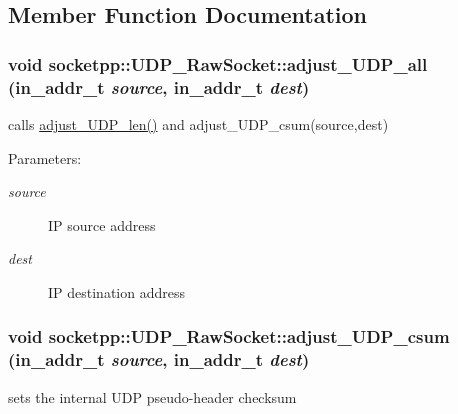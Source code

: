 \subsection{Member Function Documentation}
\hypertarget{classsocketpp_1_1UDP__RawSocket_4fe2e6b184ca8f8248a187df30e12fd2}{
\subsubsection[{adjust\_\-UDP\_\-all}]{\setlength{\rightskip}{0pt plus 5cm}void socketpp::UDP\_\-RawSocket::adjust\_\-UDP\_\-all (in\_\-addr\_\-t {\em source}, \/  in\_\-addr\_\-t {\em dest})}}
\label{classsocketpp_1_1UDP__RawSocket_4fe2e6b184ca8f8248a187df30e12fd2}


calls \hyperlink{classsocketpp_1_1UDP__RawSocket_1caa413cfe4f72d8c0aeccdcb10469b5}{adjust\_\-UDP\_\-len()} and adjust\_\-UDP\_\-csum(source,dest) 

\begin{Desc}
\item[Parameters:]
\begin{description}
\item[{\em source}]IP source address \item[{\em dest}]IP destination address \end{description}
\end{Desc}
\hypertarget{classsocketpp_1_1UDP__RawSocket_8d96a58ee9d39e2c014aa81ded23727a}{
\subsubsection[{adjust\_\-UDP\_\-csum}]{\setlength{\rightskip}{0pt plus 5cm}void socketpp::UDP\_\-RawSocket::adjust\_\-UDP\_\-csum (in\_\-addr\_\-t {\em source}, \/  in\_\-addr\_\-t {\em dest})}}
\label{classsocketpp_1_1UDP__RawSocket_8d96a58ee9d39e2c014aa81ded23727a}


sets the internal UDP pseudo-header checksum 

